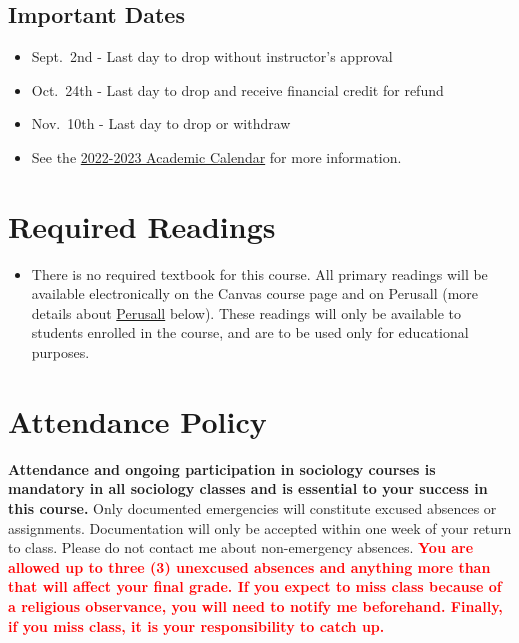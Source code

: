 \documentclass[11pt,]{article}
\providecommand{\tightlist}{%
  \setlength{\itemsep}{0pt}\setlength{\parskip}{0pt}}
\begin{document}
\hypertarget{important-dates}{%
\subsection{Important Dates}\label{important-dates}}

\begin{itemize}
\tightlist
\item
  Sept.~2nd - Last day to drop without instructor's approval\\
\item
  Oct.~24th - Last day to drop and receive financial credit for refund\\
\item
  Nov.~10th - Last day to drop or withdraw\\
\item
  See the
  \href{https://www.csuchico.edu/apss/calendar/aca-cal-2022-23.shtml}{2022-2023
  Academic Calendar} for more information.
\end{itemize}

\hypertarget{required-readings}{%
\section{Required Readings}\label{required-readings}}

\begin{itemize}
\tightlist
\item
  There is no required textbook for this course. All primary readings
  will be available electronically on the Canvas course page and on
  Perusall (more details about \protect\hyperlink{perusall}{Perusall}
  below). These readings will only be available to students enrolled in
  the course, and are to be used only for educational purposes.
\end{itemize}

\hypertarget{attendance}{%
\section{Attendance Policy}\label{attendance}}

\textbf{Attendance and ongoing participation in sociology courses is
mandatory in all sociology classes and is essential to your success in
this course.} Only documented emergencies will constitute excused
absences or assignments. Documentation will only be accepted within one
week of your return to class. Please do not contact me about
non-emergency absences.
\textcolor{red}{\bf{You are allowed up to three (3) unexcused absences and anything more than that will affect your final grade. If you expect to miss class because of a religious observance, you will need to notify me beforehand. Finally, if you miss class, it is your responsibility to catch up.}}
\end{document}
